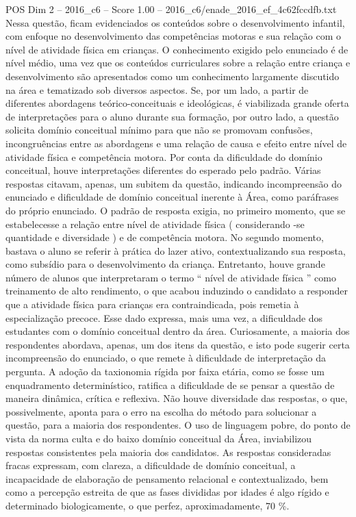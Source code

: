 \begin{textsample}{POS Dim 2 – 2016\_c6 – Score 1.00 – 2016\_c6/enade\_2016\_ef\_4c62fccdfb.txt}
Nessa questão, ficam evidenciados os conteúdos sobre o desenvolvimento infantil, com enfoque no desenvolvimento das competências motoras e sua relação com o nível de atividade física em crianças.
O conhecimento exigido pelo enunciado é de nível médio, uma vez que os conteúdos curriculares sobre a relação entre criança e desenvolvimento são apresentados como um conhecimento largamente discutido na área e tematizado sob diversos aspectos.
Se, por um lado, a partir de diferentes abordagens teórico-conceituais e ideológicas, é viabilizada grande oferta de interpretações para o aluno durante sua formação, por outro lado, a questão solicita domínio conceitual mínimo para que não se promovam confusões, incongruências entre as abordagens e uma relação de causa e efeito entre nível de atividade física e competência motora.
Por conta da dificuldade do domínio conceitual, houve interpretações diferentes do esperado pelo padrão.
Várias respostas citavam, apenas, um subitem da questão, indicando incompreensão do enunciado e dificuldade de domínio conceitual inerente à Área, como paráfrases do próprio enunciado.
O padrão de resposta exigia, no primeiro momento, que se estabelecesse a relação entre nível de atividade física ( considerando -se quantidade e diversidade ) e de competência motora.
No segundo momento, bastava o aluno se referir à prática do lazer ativo, contextualizando sua resposta, como subsídio para o desenvolvimento da criança.
Entretanto, houve grande número de alunos que interpretaram o termo “ nível de atividade física ” como treinamento de alto rendimento, o que acabou induzindo o candidato a responder que a atividade física para crianças era contraindicada, pois remetia à especialização precoce.
Esse dado expressa, mais uma vez, a dificuldade dos estudantes com o domínio conceitual dentro da área.
Curiosamente, a maioria dos respondentes abordava, apenas, um dos itens da questão, e isto pode sugerir certa incompreensão do enunciado, o que remete à dificuldade de interpretação da pergunta.
A adoção da taxionomia rígida por faixa etária, como se fosse um enquadramento determinístico, ratifica a dificuldade de se pensar a questão de maneira dinâmica, crítica e reflexiva.
Não houve diversidade das respostas, o que, possivelmente, aponta para o erro na escolha do método para solucionar a questão, para a maioria dos respondentes.
O uso de linguagem pobre, do ponto de vista da norma culta e do baixo domínio conceitual da Área, inviabilizou respostas consistentes pela maioria dos candidatos.
As respostas consideradas fracas expressam, com clareza, a dificuldade de domínio conceitual, a incapacidade de elaboração de pensamento relacional e contextualizado, bem como a percepção estreita de que as fases divididas por idades é algo rígido e determinado biologicamente, o que perfez, aproximadamente, 70 \%.

\end{textsample}
